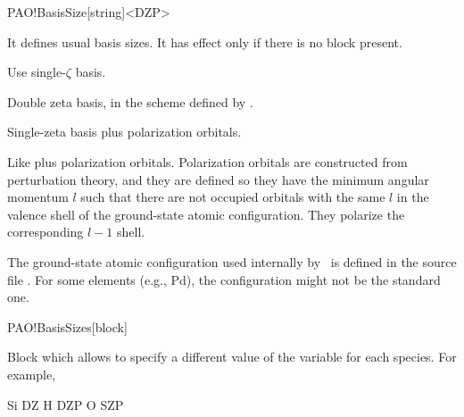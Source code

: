 \begin{fdfentry}{PAO!BasisSize}[string]<DZP>

  It defines usual basis sizes. It has effect only if there is no
  block  present.

  \begin{fdfoptions}

    \option[SZ|minimal]%

    Use single-$\zeta$ basis.


    \option[DZ]%

    Double zeta basis, in the scheme defined by .


    \option[SZP]%

    Single-zeta basis plus polarization orbitals.

    
    
    Like  plus polarization orbitals. Polarization orbitals
    are constructed from perturbation theory, and they are defined so they
    have the minimum angular momentum $l$
    such that there are not occupied orbitals with the same $l$ in the
    valence shell of the ground-state atomic configuration. They
    polarize the corresponding $l-1$ shell.

    \note The ground-state atomic configuration used internally by
    \siesta\ is defined in the source file
    .  For some elements (e.g., Pd), the
    configuration might not be the standard one.
    
  \end{fdfoptions}

\end{fdfentry}


\begin{fdfentry}{PAO!BasisSizes}[block]

  Block which allows to specify a different value of the variable
   for each species. For example,
  \begin{fdfexample}
         Si      DZ
         H       DZP
         O       SZP
  \end{fdfexample}
  
\end{fdfentry}



